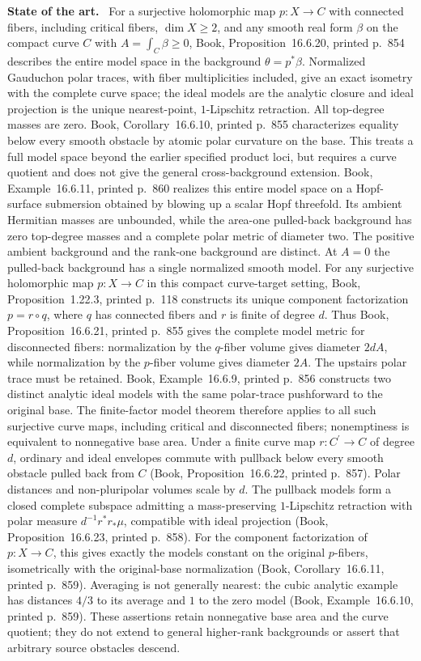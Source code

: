 \documentclass[11pt]{article}
\newcommand{\field}[1]{\par\medskip\noindent\textbf{#1.}\ }
\begin{document}
\field{State of the art} For a surjective holomorphic map $p:X\to C$ with connected fibers, including critical fibers, $\dim X\geq2$, and any smooth real form $\beta$ on the compact curve $C$ with $A=\int_C\beta\geq0$, Book, Proposition~16.6.20, printed p.~854 describes the entire model space in the background $\theta=p^*\beta$. Normalized Gauduchon polar traces, with fiber multiplicities included, give an exact isometry with the complete curve space; the ideal models are the analytic closure and ideal projection is the unique nearest-point, $1$-Lipschitz retraction. All top-degree masses are zero. Book, Corollary~16.6.10, printed p.~855 characterizes equality below every smooth obstacle by atomic polar curvature on the base. This treats a full model space beyond the earlier specified product loci, but requires a curve quotient and does not give the general cross-background extension. Book, Example~16.6.11, printed p.~860 realizes this entire model space on a Hopf-surface submersion obtained by blowing up a scalar Hopf threefold. Its ambient Hermitian masses are unbounded, while the area-one pulled-back background has zero top-degree masses and a complete polar metric of diameter two. The positive ambient background and the rank-one background are distinct. At $A=0$ the pulled-back background has a single normalized smooth model. For any surjective holomorphic map $p:X\to C$ in this compact curve-target setting, Book, Proposition~1.22.3, printed p.~118 constructs its unique component factorization $p=r\circ q$, where $q$ has connected fibers and $r$ is finite of degree $d$. Thus Book, Proposition~16.6.21, printed p.~855 gives the complete model metric for disconnected fibers: normalization by the $q$-fiber volume gives diameter $2dA$, while normalization by the $p$-fiber volume gives diameter $2A$. The upstairs polar trace must be retained. Book, Example~16.6.9, printed p.~856 constructs two distinct analytic ideal models with the same polar-trace pushforward to the original base. The finite-factor model theorem therefore applies to all such surjective curve maps, including critical and disconnected fibers; nonemptiness is equivalent to nonnegative base area. Under a finite curve map $r:C^{\prime}\to C$ of degree $d$, ordinary and ideal envelopes commute with pullback below every smooth obstacle pulled back from $C$ (Book, Proposition~16.6.22, printed p.~857). Polar distances and non-pluripolar volumes scale by $d$. The pullback models form a closed complete subspace admitting a mass-preserving $1$-Lipschitz retraction with polar measure $d^{-1}r^*r_*\mu$, compatible with ideal projection (Book, Proposition~16.6.23, printed p.~858). For the component factorization of $p:X\to C$, this gives exactly the models constant on the original $p$-fibers, isometrically with the original-base normalization (Book, Corollary~16.6.11, printed p.~859). Averaging is not generally nearest: the cubic analytic example has distances $4/3$ to its average and $1$ to the zero model (Book, Example~16.6.10, printed p.~859). These assertions retain nonnegative base area and the curve quotient; they do not extend to general higher-rank backgrounds or assert that arbitrary source obstacles descend.
\end{document}
